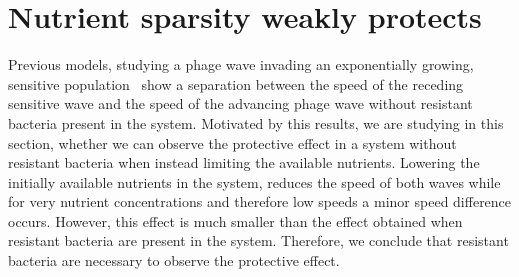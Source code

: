 \section{Nutrient sparsity weakly protects}
Previous models, studying a phage wave invading an exponentially growing, sensitive population~\cite{Claydon2021-cu} show a separation between the speed of the receding sensitive wave and the speed of the advancing phage wave without resistant bacteria present in the system. Motivated by this results, we are studying in this section, whether we can observe the protective effect in a system without resistant bacteria when instead limiting the available nutrients. Lowering the initially available nutrients in the system, reduces the speed of both waves while for very nutrient concentrations and therefore low speeds a minor speed difference occurs. However, this effect is much smaller than the effect obtained when resistant bacteria are present in the system. Therefore, we conclude that resistant bacteria are necessary to observe the protective effect.
